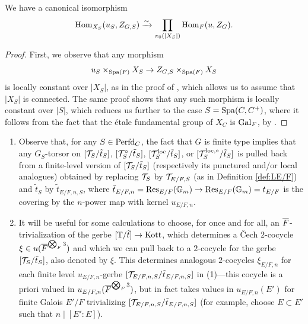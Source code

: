 \begin{lem}\label{lem:inertialhom}
    We have a canonical isomorphism
    \begin{equation*}
        \mathrm{Hom}_{X_{S}}(u_{S}, Z_{G,S}) \xrightarrow{\sim} \prod_{\pi_{0}(|X_{S}|)} \mathrm{Hom}_{F}(u,Z_{G}).
    \end{equation*}
\end{lem}

\begin{proof}
First, we observe that any morphism 
 \begin{equation*}
u_{S} \times_{\mathrm{Spa}(F)} X_{S} \to Z_{G,S} \times_{\mathrm{Spa}(F)} X_{S}
 \end{equation*}
 is locally constant over $|X_{S}|$, as in the proof of \cite[Proposition 12.5]{Fargues22}, which allows us to assume that $|X_{S}|$ is connected. The same proof shows that any such morphism is locally constant over $|S|$, which reduces us further to the case $S = \mathrm{Spa}(C,C^{+})$, where it follows from the fact that the étale fundamental group of $X_{C}$ is $\mathrm{Gal}_{F}$, by \cite[Th\'{e}or\`{e}me 9.5.1]{FF}.
\end{proof}

\begin{rque}\label{rque:fingerbe}
\begin{enumerate} \item{Observe that, for any $S \in \mathrm{Perfd}_{C}$, the fact that $G$ is finite type implies that any $G_{S}$-torsor on $[\mathcal{T}_{S}/\tilde{t}_{S}]$, $[\mathcal{T}_{S}^{\circ}/\tilde{t}_{S}]$, $[\mathcal{T}_{S}^{\mathrm{loc}}/\tilde{t}_{S}]$, or $[\mathcal{T}_{S}^{\mathrm{loc},\circ}/\tilde{t}_{S}]$ is pulled back from a finite-level version of $[\mathcal{T}_{S}/\tilde{t}_{S}]$ (respectively its punctured and/or local analogues) obtained by replacing $\mathcal{T}_{S}$ by $\mathcal{T}_{E/F,S}$ (as in Definition \ref{def:LE/F}) and $\tilde{t}_{S}$ by $\tilde{t}_{E/F,n,S}$, where $\tilde{t}_{E/F,n} = \mathrm{Res}_{E/F}(\mathbb{G}_{m}) \to  \mathrm{Res}_{E/F}(\mathbb{G}_{m}) = t_{E/F}$ is the covering by the $n$-power map with kernel $u_{E/F,n}$.}

\item{It will be useful for some calculations to choose, for once and for all, an $\overline{F}$-trivialization of the gerbe  $[\mathbb{T}/\tilde{t}] \to \mathrm{Kott}$, which determines a \v{C}ech $2$-cocycle $\xi \in u(\overline{F}^{\bigotimes_{F}3})$ and which we can pull back to a $2$-cocycle for the gerbe $[\mathcal{T}_{S}/\tilde{t}_{S}]$, also denoted by $\xi$. This determines analogous $2$-cocycles $\xi_{E/F,n}$ for each finite level $u_{E/F,n}$-gerbe $[\mathcal{T}_{E/F,n,S}/\tilde{t}_{E/F,n,S}]$ in (1)---this cocycle is a priori valued in $u_{E/F,n}(\overline{F}^{\bigotimes_{F}3})$, but in fact takes values in $u_{E/F,n}(E')$ for finite Galois $E'/F$ trivializing $[\mathcal{T}_{E/F,n,S}/\tilde{t}_{E/F,n,S}]$ (for example, choose $E \subset E'$ such that $n \mid [E' \colon E]$).}

\end{enumerate}
\end{rque}

